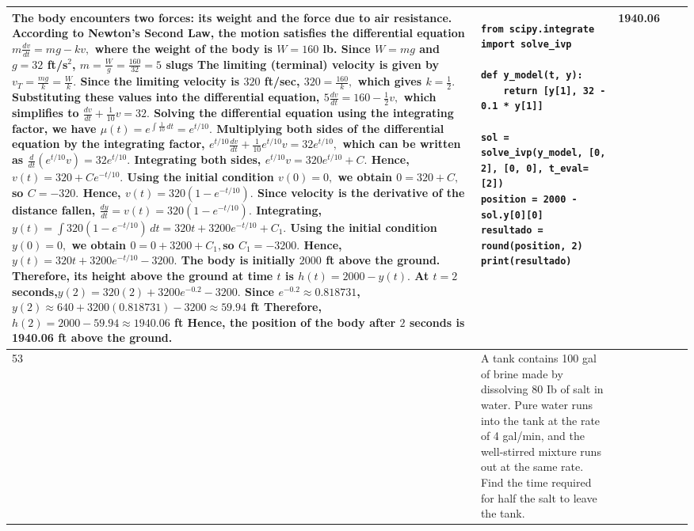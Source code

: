 \documentclass[a4paper,12pt]{article}
\begin{document}
\begin{longtable}{|p{0.3cm}|p{}|p{10cm}|p{}|p{1.5cm}|}
The body encounters two forces: its weight and the force due to air resistance. According to Newton's Second Law, the motion satisfies the differential equation $m\frac{dv}{dt}=mg-kv,$ where the weight of the body is $W=160$ lb. Since $W=mg$ and $g=32$ ft/s$^2$,
$m=\frac{W}{g}=\frac{160}{32}=5$ slugs
The limiting (terminal) velocity is given by
$v_T=\frac{mg}{k}=\frac{W}{k}.$
Since the limiting velocity is $320$ ft/sec,
$320=\frac{160}{k},$
which gives $k=\frac{1}{2}.$
Substituting these values into the differential equation, $5\frac{dv}{dt}=160-\frac{1}{2}v,$
which simplifies to
$\frac{dv}{dt}+\frac{1}{10}v=32.$
Solving the differential equation using the integrating factor, we have
$\mu(t)=e^{\int\frac{1}{10}\,dt}=e^{t/10}.$
Multiplying both sides of the differential equation by the integrating factor,
$e^{t/10}\frac{dv}{dt}+\frac{1}{10}e^{t/10}v=32e^{t/10},$
which can be written as 
$\frac{d}{dt}\left(e^{t/10}v\right)=32e^{t/10}.$
Integrating both sides, $e^{t/10}v=320e^{t/10}+C.$
Hence, $v(t)=320+Ce^{-t/10}.$
Using the initial condition $v(0)=0,$
we obtain $0=320+C,$
so $C=-320.$ Hence,
$v(t)=320\left(1-e^{-t/10}\right).$
Since velocity is the derivative of the distance fallen,
$\frac{dy}{dt}=v(t)=320\left(1-e^{-t/10}\right).$
Integrating,
$y(t)=\int320\left(1-e^{-t/10}\right)\,dt
=320t+3200e^{-t/10}+C_1.$
Using the initial condition
$y(0)=0,$ we obtain $0=0+3200+C_1,$so $C_1=-3200.$
Hence,$y(t)=320t+3200e^{-t/10}-3200.$
The body is initially $2000$ ft above the ground. Therefore, its height above the ground at time $t$ is
$h(t)=2000-y(t).$ At $t=2$ seconds,$y(2)=320(2)+3200e^{-0.2}-3200.$
Since $e^{-0.2}\approx0.818731$,
$y(2)\approx640+3200(0.818731)-3200
\approx59.94$ ft
Therefore, $h(2)=2000-59.94
\approx1940.06$ ft
Hence, the position of the body after $2$ seconds is
1940.06 ft above the ground.

 &\begin{verbatim}
from scipy.integrate import solve_ivp

def y_model(t, y):
    return [y[1], 32 - 0.1 * y[1]]

sol = solve_ivp(y_model, [0, 2], [0, 0], t_eval=[2])
position = 2000 - sol.y[0][0]
resultado = round(position, 2)
print(resultado)
\end{verbatim}& 1940.06 \\ \hline 
 53           & A tank contains 100 gal of brine made by dissolving 80 Ib of salt in water. Pure water runs into the tank at the rate of 4 gal/min, and the well-stirred mixture runs out at the same rate. Find the time required for half the salt to leave the tank.



\end{longtable}
\end{document}
